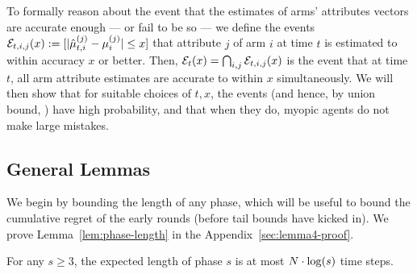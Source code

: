 To formally reason about the event that the estimates of arms'
attributes vectors are accurate enough --- or fail to be so ---
we define the events
${\mathcal E}_{t,i,j}(x) := [|\hat{\mu}_{t,i}^{(j)} - \mu_{i}^{(j)}| \leq x]$
that attribute $j$ of arm $i$ at time $t$ is estimated to
within accuracy $x$ or better.
Then, 
${\mathcal E}_{t}(x) = \bigcap_{i,j} {\mathcal E}_{t,i,j}(x)$
is the event that at time $t$, all arm attribute
estimates are accurate to within $x$ simultaneously.
We will then show that for suitable choices of $t, x$,
the events 
(and hence, by union bound, )
have high probability,
and that when they do, myopic agents do not make large mistakes.


\subsection{General Lemmas}





We begin by bounding the length of any phase, which will be useful to bound
the cumulative regret of the early rounds
(before tail bounds have kicked in). We prove Lemma~\ref{lem:phase-length} in the Appendix~\ref{sec:lemma4-proof}.


\begin{lemma} \label{lem:phase-length}
For any $s\geq 3$, the expected length of phase $s$ is at most
$N \cdot \log(s)$ time steps.
\end{lemma}
                  
